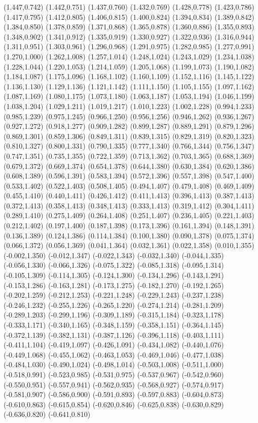 (1.447,0.742) (1.442,0.751) (1.437,0.760) (1.432,0.769) (1.428,0.778) (1.423,0.786) (1.417,0.795) (1.412,0.805) (1.406,0.815) (1.400,0.824) (1.394,0.834) (1.389,0.842) (1.384,0.850) (1.378,0.859) (1.371,0.868) (1.365,0.878) (1.360,0.886) (1.355,0.893) (1.348,0.902) (1.341,0.912) (1.335,0.919) (1.330,0.927) (1.322,0.936) (1.316,0.944) (1.311,0.951) (1.303,0.961) (1.296,0.968) (1.291,0.975) (1.282,0.985) (1.277,0.991) (1.270,1.000) (1.262,1.008) (1.257,1.014) (1.248,1.024) (1.243,1.029) (1.234,1.038) (1.228,1.044) (1.220,1.053) (1.214,1.059) (1.205,1.068) (1.199,1.073) (1.190,1.082) (1.184,1.087) (1.175,1.096) (1.168,1.102) (1.160,1.109) (1.152,1.116) (1.145,1.122) (1.136,1.130) (1.129,1.136) (1.121,1.142) (1.111,1.150) (1.105,1.155) (1.097,1.162) (1.087,1.169) (1.080,1.175) (1.073,1.180) (1.063,1.187) (1.053,1.194) (1.046,1.199) (1.038,1.204) (1.029,1.211) (1.019,1.217) (1.010,1.223) (1.002,1.228) (0.994,1.233) (0.985,1.239) (0.975,1.245) (0.966,1.250) (0.956,1.256) (0.946,1.262) (0.936,1.267) (0.927,1.272) (0.918,1.277) (0.909,1.282) (0.899,1.287) (0.889,1.291) (0.879,1.296) (0.869,1.301) (0.859,1.306) (0.849,1.311) (0.839,1.315) (0.829,1.319) (0.820,1.323) (0.810,1.327) (0.800,1.331) (0.790,1.335) (0.777,1.340) (0.766,1.344) (0.756,1.347) (0.747,1.351) (0.735,1.355) (0.722,1.359) (0.713,1.362) (0.703,1.365) (0.688,1.369) (0.679,1.372) (0.669,1.374) (0.654,1.378) (0.644,1.380) (0.630,1.384) (0.620,1.386) (0.608,1.389) (0.596,1.391) (0.583,1.394) (0.572,1.396) (0.557,1.398) (0.547,1.400) (0.533,1.402) (0.522,1.403) (0.508,1.405) (0.494,1.407) (0.479,1.408) (0.469,1.409) (0.455,1.410) (0.440,1.411) (0.426,1.412) (0.411,1.413) (0.396,1.413) (0.387,1.413) (0.372,1.413) (0.358,1.413) (0.348,1.413) (0.333,1.413) (0.319,1.412) (0.304,1.411) (0.289,1.410) (0.275,1.409) (0.264,1.408) (0.251,1.407) (0.236,1.405) (0.221,1.403) (0.212,1.402) (0.197,1.400) (0.187,1.398) (0.173,1.396) (0.161,1.394) (0.148,1.391) (0.136,1.389) (0.124,1.386) (0.114,1.384) (0.100,1.380) (0.090,1.378) (0.075,1.374) (0.066,1.372) (0.056,1.369) (0.041,1.364) (0.032,1.361) (0.022,1.358) (0.010,1.355) (-0.002,1.350) (-0.012,1.347) (-0.022,1.343) (-0.032,1.340) (-0.044,1.335) (-0.056,1.330) (-0.066,1.326) (-0.075,1.322) (-0.085,1.318) (-0.095,1.314) (-0.105,1.309) (-0.114,1.305) (-0.124,1.300) (-0.134,1.296) (-0.143,1.291) (-0.153,1.286) (-0.163,1.281) (-0.173,1.275) (-0.182,1.270) (-0.192,1.265) (-0.202,1.259) (-0.212,1.253) (-0.221,1.248) (-0.229,1.243) (-0.237,1.238) (-0.246,1.232) (-0.255,1.226) (-0.265,1.220) (-0.274,1.214) (-0.281,1.209) (-0.289,1.203) (-0.299,1.196) (-0.309,1.189) (-0.315,1.184) (-0.323,1.178) (-0.333,1.171) (-0.340,1.165) (-0.348,1.159) (-0.358,1.151) (-0.364,1.145) (-0.372,1.139) (-0.382,1.131) (-0.387,1.126) (-0.396,1.118) (-0.403,1.111) (-0.411,1.104) (-0.419,1.097) (-0.426,1.091) (-0.434,1.082) (-0.440,1.076) (-0.449,1.068) (-0.455,1.062) (-0.463,1.053) (-0.469,1.046) (-0.477,1.038) (-0.484,1.030) (-0.490,1.024) (-0.498,1.014) (-0.503,1.008) (-0.511,1.000) (-0.518,0.991) (-0.523,0.985) (-0.531,0.975) (-0.537,0.967) (-0.542,0.960) (-0.550,0.951) (-0.557,0.941) (-0.562,0.935) (-0.568,0.927) (-0.574,0.917) (-0.581,0.907) (-0.586,0.900) (-0.591,0.893) (-0.597,0.883) (-0.604,0.873) (-0.610,0.863) (-0.615,0.854) (-0.620,0.846) (-0.625,0.838) (-0.630,0.829) (-0.636,0.820) (-0.641,0.810) 